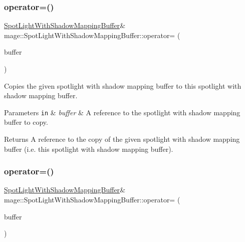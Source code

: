 \subsubsection{\texorpdfstring{operator=()}{operator=()}\hspace{0.1cm}{\footnotesize\ttfamily [1/2]}}
{\footnotesize\ttfamily \hyperlink{structmage_1_1_spot_light_with_shadow_mapping_buffer}{Spot\+Light\+With\+Shadow\+Mapping\+Buffer}\& mage\+::\+Spot\+Light\+With\+Shadow\+Mapping\+Buffer\+::operator= (\begin{DoxyParamCaption}\item[{const \hyperlink{structmage_1_1_spot_light_with_shadow_mapping_buffer}{Spot\+Light\+With\+Shadow\+Mapping\+Buffer} \&}]{buffer }\end{DoxyParamCaption})\hspace{0.3cm}{\ttfamily [default]}}

Copies the given spotlight with shadow mapping buffer to this spotlight with shadow mapping buffer.


\begin{DoxyParams}[1]{Parameters}
\mbox{\tt in}  & {\em buffer} & A reference to the spotlight with shadow mapping buffer to copy. \\
\hline
\end{DoxyParams}
\begin{DoxyReturn}{Returns}
A reference to the copy of the given spotlight with shadow mapping buffer (i.\+e. this spotlight with shadow mapping buffer). 
\end{DoxyReturn}
\hypertarget{structmage_1_1_spot_light_with_shadow_mapping_buffer_abb7324a9b98123e701b1e61cc7720cf9}{}\label{structmage_1_1_spot_light_with_shadow_mapping_buffer_abb7324a9b98123e701b1e61cc7720cf9} 
\subsubsection{\texorpdfstring{operator=()}{operator=()}\hspace{0.1cm}{\footnotesize\ttfamily [2/2]}}
{\footnotesize\ttfamily \hyperlink{structmage_1_1_spot_light_with_shadow_mapping_buffer}{Spot\+Light\+With\+Shadow\+Mapping\+Buffer}\& mage\+::\+Spot\+Light\+With\+Shadow\+Mapping\+Buffer\+::operator= (\begin{DoxyParamCaption}\item[{\hyperlink{structmage_1_1_spot_light_with_shadow_mapping_buffer}{Spot\+Light\+With\+Shadow\+Mapping\+Buffer} \&\&}]{buffer }\end{DoxyParamCaption})\hspace{0.3cm}{\ttfamily [default]}}

